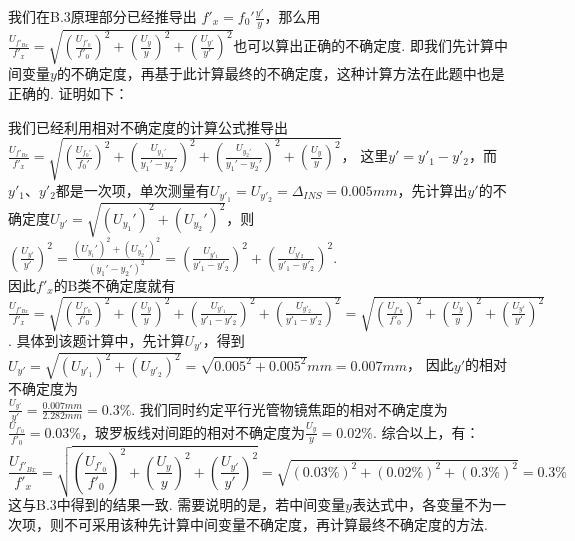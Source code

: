 \documentclass[UTF8]{ctexart}
\begin{document}
我们在B.3原理部分已经推导出
$\displaystyle{f'_x=f_0'\frac{y'}{y}}$，那么用$\displaystyle{\frac{U_{f'_{Bx}}}{f'_x}=\sqrt{(\frac{U_{f'_0}}{f'_0})^2+(\frac{U_{y}}{y})^2+(\frac{U_{y'}}{y'})^2}}$也可以算出正确的不确定度. 即我们先计算中间变量$y$的不确定度，再基于此计算最终的不确定度，这种计算方法在此题中也是正确的. 证明如下：\par
我们已经利用相对不确定度的计算公式推导出$\displaystyle{\frac{U_{f'_{Bx}}}{f'_x}=\sqrt{(\frac{U_{f_0'}}{f_0'})^2+(\frac{U_{y_1'}}{y_1'-y_2'})^2+(\frac{U_{y_2'}}{y_1'-y_2'})^2+(\frac{U_{y}}{y})^2}}$，
这里$y'=y'_1-y'_2$，而$y'_1$、$y'_2$都是一次项，单次测量有$U_{y'_{1}}=U_{y'_{2}}=\Delta_{INS}=0.005mm$，先计算出$y'$的不确定度$\displaystyle{U_{y'}=\sqrt{(U_{y_1}')^2+(U_{y_2}')^2}}$，则$\displaystyle{(\frac{U_{y'}}{y'})^2=\frac{(U_{y_1}')^2+(U_{y_2}')^2}{(y_1'-y_2')^2}=(\frac{U_{y'_1}}{y'_1-y'_2})^2+(\frac{U_{y'_2}}{y'_1-y'_2})^2}$.\\
因此$f'_x$的B类不确定度就有$\displaystyle{\frac{U_{f'_{Bx}}}{f'_x}=\sqrt{(\frac{U_{f'_0}}{f'_0})^2+(\frac{U_{y}}{y})^2+(\frac{U_{y'_1}}{y'_1-y'_2})^2+(\frac{U_{y'_2}}{y'_1-y'_2})^2}=\sqrt{(\frac{U_{f'_0}}{f'_0})^2+(\frac{U_{y}}{y})^2+(\frac{U_{y'}}{y'})^2}}$.
具体到该题计算中，先计算$U_{y'}$，得到$\displaystyle{U_{y'}=\sqrt{(U_{y'_{1}})^2+(U_{y'_{2}})^2}=\sqrt{0.005^2+0.005^2}mm=0.007mm}$， 因此$y'$的相对不确定度为\\$\displaystyle{\frac{U_{y'}}{y'}=\frac{0.007mm}{2.282mm}=0.3\%}$. 
我们同时约定平行光管物镜焦距的相对不确定度为$\displaystyle{\frac{U_{f'_0}}{f'_0}=0.03\%}$，玻罗板线对间距的相对不确定度为$\displaystyle{\frac{U_{y}}{y}=0.02\%}$. 综合以上，有：
\[\frac{U_{f'_{Bx}}}{f'_x}=\sqrt{(\frac{U_{f'_0}}{f'_0})^2+(\frac{U_{y}}{y})^2+(\frac{U_{y'}}{y'})^2}=\sqrt{(0.03\%)^2+(0.02\%)^2+(0.3\%)^2}=0.3\%\]
这与B.3中得到的结果一致. 需要说明的是，若中间变量$y$表达式中，各变量不为一次项，则不可采用该种先计算中间变量不确定度，再计算最终不确定度的方法.
\end{document}
